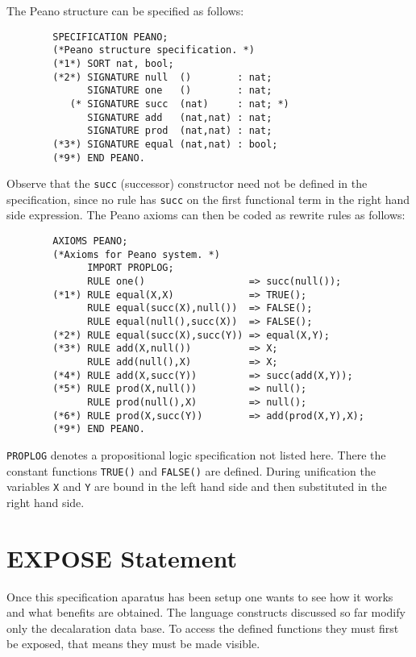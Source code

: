 The Peano structure can be specified as follows:
\begin{verbatim}
        SPECIFICATION PEANO;
        (*Peano structure specification. *)
        (*1*) SORT nat, bool;
        (*2*) SIGNATURE null  ()        : nat;
              SIGNATURE one   ()        : nat;
           (* SIGNATURE succ  (nat)     : nat; *)
              SIGNATURE add   (nat,nat) : nat;
              SIGNATURE prod  (nat,nat) : nat;
        (*3*) SIGNATURE equal (nat,nat) : bool;
        (*9*) END PEANO.
\end{verbatim}
Observe that the \verb/succ/ (successor) constructor 
need not be defined in the specification, since 
no rule has \verb/succ/ on the first functional term 
in the right hand side expression. 
The Peano axioms can then be coded as rewrite rules
as follows:
\begin{verbatim}
        AXIOMS PEANO;
        (*Axioms for Peano system. *)
              IMPORT PROPLOG;
              RULE one()                  => succ(null());
        (*1*) RULE equal(X,X)             => TRUE();
              RULE equal(succ(X),null())  => FALSE();
              RULE equal(null(),succ(X))  => FALSE();
        (*2*) RULE equal(succ(X),succ(Y)) => equal(X,Y);
        (*3*) RULE add(X,null())          => X;
              RULE add(null(),X)          => X;
        (*4*) RULE add(X,succ(Y))         => succ(add(X,Y));
        (*5*) RULE prod(X,null())         => null();
              RULE prod(null(),X)         => null();
        (*6*) RULE prod(X,succ(Y))        => add(prod(X,Y),X);
        (*9*) END PEANO.
\end{verbatim}
\verb/PROPLOG/ denotes a propositional logic specification 
not listed here. 
There the constant functions 
\verb/TRUE()/ and \verb/FALSE()/ are defined.
During unification the variables \verb/X/ and \verb/Y/ 
are bound in the left hand side and then substituted in the 
right hand side.


\section{EXPOSE Statement}

Once this specification aparatus has been setup one 
wants to see how it works and what benefits are obtained.
The language constructs discussed so far 
modify only the decalaration data base. 
To access the defined functions they must first be exposed,  
that means they must be made visible.  

